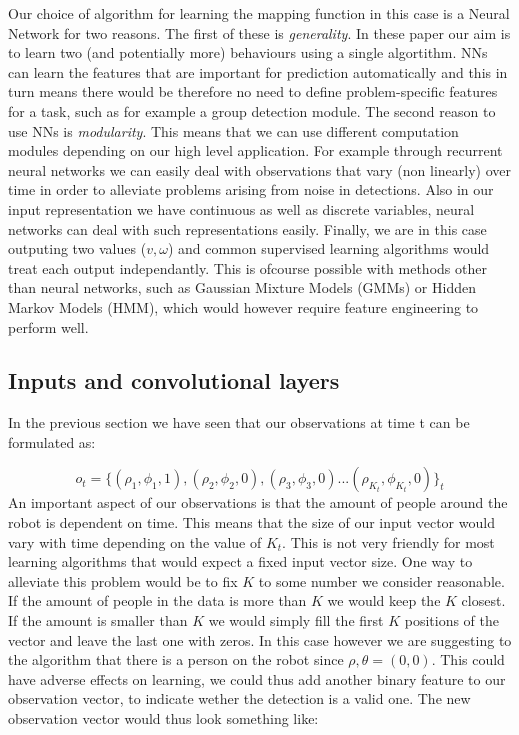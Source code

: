 \documentclass[letterpaper, 10 pt, conference]{ieeeconf}
\begin{document}
Our choice of algorithm for learning the mapping function in this case is a Neural Network for two reasons. The first of these is \emph{generality}. In these paper our aim is to learn two (and potentially more) behaviours using a single algortithm. NNs can learn the features that are important for prediction automatically and this in turn means there would be therefore no need to define problem-specific features for a task, such as for example a group detection module. The second reason to use NNs is \emph{modularity}. This means that we can use different computation modules depending on our high level application. For example through recurrent neural networks we can easily deal with observations that vary (non linearly) over time in order to alleviate problems arising from noise in detections. Also in our input representation we have continuous as well as discrete variables, neural networks can deal with such representations easily. Finally, we are in this case outputing two values ($v,\omega$) and common supervised learning algorithms would treat each output independantly. This is ofcourse possible with methods other than neural networks, such as Gaussian Mixture Models (GMMs) or Hidden Markov Models (HMM), which would however require feature engineering to perform well.  

\subsection{Inputs and convolutional layers}
In the previous section we have seen that our observations at time t can be formulated as:

\begin{equation}
 	o_t = \{(\rho_1,\phi_1,1), (\rho_2,\phi_2,0),(\rho_3,\phi_3,0) ... (\rho_{K_t},\phi_{K_t},0)\}_t
\end{equation}
An important aspect of our observations is that the amount of people around the robot is dependent on time. This means that the size of our input vector would vary with time depending on the value of $K_t$. This is not very friendly for most learning algorithms that would expect a fixed input vector size. One way to alleviate this problem would be to fix $K$ to some number we consider reasonable. If the amount of people in the data is more than $K$ we would keep the $K$ closest. If the amount is smaller than $K$ we would simply fill the first $K$ positions of the vector and leave the last one with zeros. In this case however we are suggesting to the algorithm that there is a person on the robot since $\rho,\theta = (0,0)$. This could have adverse effects on learning, we could thus add another binary feature to our observation vector, to indicate wether the detection is a valid one. The new observation vector would thus look something like:
\end{document}
